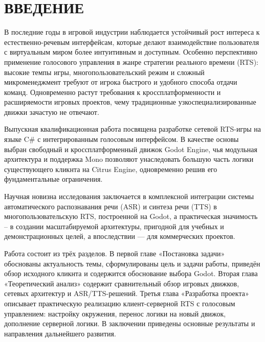 \section*{ВВЕДЕНИЕ}
    В последние годы в игровой индустрии наблюдается устойчивый рост интереса к естественно-речевым интерфейсам, которые делают взаимодействие 
    пользователя с виртуальным миром более интуитивным и доступным. Особенно перспективно применение голосового управления в жанре стратегии 
    реального времени (RTS): высокие темпы игры, многопользовательский режим и сложный микроменеджмент требуют от игрока быстрого и удобного 
    способа отдачи команд. Одновременно растут требования к кроссплатформенности и расширяемости игровых проектов, чему традиционные 
    узкоспециализированные движки зачастую не отвечают.

    Выпускная квалификационная работа посвящена разработке сетевой RTS-игры на языке C\# с интегрированным голосовым интерфейсом. В качестве основы 
    выбран свободный и кроссплатформенный движок Godot Engine, чья модульная архитектура и поддержка Mono позволяют унаследовать большую часть 
    логики существующего кликнта на Citrus Engine, одновременно решив его фундаментальные ограничения.

    Научная новизна исследования заключается в комплексной интеграции системы автоматического распознавания речи (ASR) и синтеза речи (TTS) в 
    многопользовательскую RTS, построенной на Godot, а практическая значимость -- в создании масштабируемой архитектуры, пригодной для учебных и 
    демонстрационных целей, а впоследствии — для коммерческих проектов.

    Работа состоит из трёх разделов. В первой главе «Постановка задачи» обоснованы актуальность темы, сформулированы цель и задачи 
    работы, приведён обзор исходного кликнта и содержится обоснование выбора Godot. Вторая глава «Теоретический анализ» 
    содержит сравнительный обзор игровых движков, сетевых архитектур и ASR/TTS-решений. 
    Третья глава «Разработка проекта» описывает практическую реализацию клиент-серверной RTS с голосовым управлением: 
    настройку окружения, перенос логики на новый движок, дополнение серверной логики. 
    В заключении приведены основные результаты и направления дальнейшего развития.